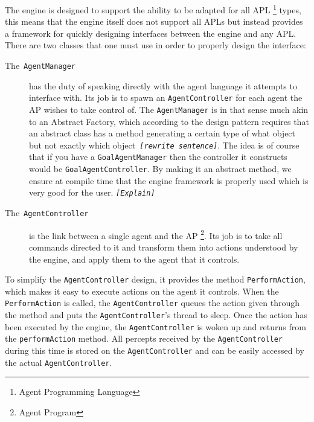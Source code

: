 The engine is designed to support the ability to be adapted for all
APL%
\footnote{Agent Programming Language%
} types, this means that the engine itself does not support all APLs
but instead provides a framework for quickly designing interfaces
between the engine and any APL. There are two classes that one must
use in order to properly design the interface:
\begin{description}
\item [{The~\texttt{AgentManager}}] has the duty of speaking directly
with the agent language it attempts to interface with. Its job is
to spawn an \texttt{AgentController} for each agent the AP wishes
to take control of. The \texttt{AgentManager} is in that sense much
akin to an Abstract Factory, which according to the design pattern
requires that an abstract class has a method generating a certain
type of what object but not exactly which object\texttt{\emph{ {[}rewrite
sentence{]}}}. The idea is of course that if you have a \texttt{GoalAgentManager}
then the controller it constructs would be \texttt{GoalAgentController}.
By making it an abstract method, we ensure at compile time that the
engine framework is properly used which is very good for the user.
\texttt{\emph{{[}Explain{]}}}
\item [{The~\texttt{AgentController}}] is the link between a single agent
and the AP %
\footnote{Agent Program%
}. Its job is to take all commands directed to it and transform them
into actions understood by the engine, and apply them to the agent
that it controls.
\end{description}
To simplify the \texttt{AgentController} design, it provides the method
\texttt{PerformAction}, which makes it easy to execute actions on
the agent it controls. When the \texttt{PerformAction} is called,
the \texttt{AgentController} queues the action given through the method
and puts the \texttt{AgentController}\textquoteright{}s thread to
sleep. Once the action has been executed by the engine, the \texttt{AgentController}
is woken up and returns from the \texttt{performAction} method. All
percepts received by the \texttt{AgentController} during this time
is stored on the \texttt{AgentController} and can be easily accessed
by the actual \texttt{AgentController}.

